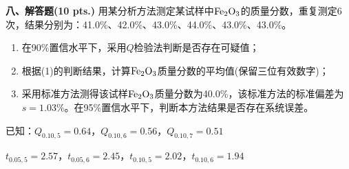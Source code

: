 \vspace{0.5cm}
\noindent\textbf{八、解答题(10 pts.)}
用某分析方法测定某试样中$\ce{Fe2O3}$的质量分数，重复测定6次，结果分别为：41.0\%、42.0\%、43.0\%、44.0\%、43.0\%、43.0\%。
\begin{enumerate}[label=(\arabic*), itemsep=1.5ex]
    \item 在90\%置信水平下，采用$Q$检验法判断是否存在可疑值；
    \item 根据(1)的判断结果，计算$\ce{Fe2O3}$质量分数的平均值(保留三位有效数字)；
    \item 采用标准方法测得该试样$\ce{Fe2O3}$质量分数为40.0\%，该标准方法的标准偏差为$s=1.03\%$。在95\%置信水平下，判断本方法结果是否存在系统误差。
\end{enumerate}

已知：$Q_{0.10,5}=0.64$，$Q_{0.10,6}=0.56$，$Q_{0.10,7}=0.51$

$t_{0.05,5}=2.57$，$t_{0.05,6}=2.45$，$t_{0.10,5}=2.02$，$t_{0.10,6}=1.94$